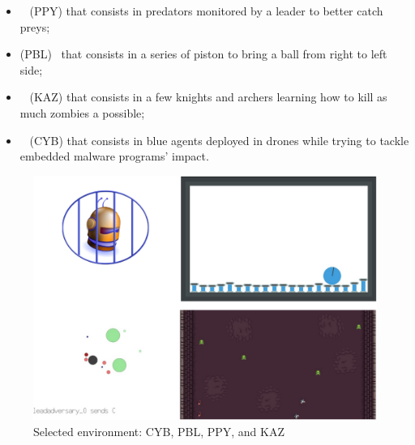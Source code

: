 \documentclass[runningheads]{llncs}
\begin{document}
\hspace{-0.6cm}
\begin{minipage}[t]{0.55\textwidth}

    \begin{itemize}
        \item {}~\cite{Lowe2017} (PPY) that consists in predators monitored by a leader to better catch preys;
        \item {} (PBL)~\cite{Terry2021} that consists in a series of piston to bring a ball from right to left side;
        \item {}~\cite{Terry2021} (KAZ) that consists in a few knights and archers learning how to kill as much zombies a possible;
        \item {}~\cite{cage_challenge_3_announcement} (CYB) that consists in blue agents deployed in drones while trying to tackle embedded malware programs' impact.
    \end{itemize}

\end{minipage}%
\hfill %
\begin{minipage}[t]{0.4\textwidth}
    \begin{figure}[H] %
        \centering
        \includegraphics[width=\linewidth]{figures/envs.png} %
        \caption{Selected environment: CYB, PBL, PPY, and KAZ}
        \label{fig:simulated_environments}
    \end{figure}
\end{minipage}
\end{document}

